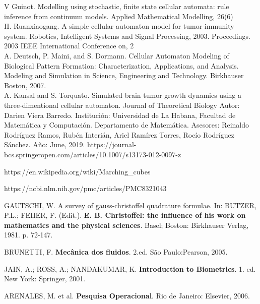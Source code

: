 \documentclass[a4paper,11pt]{article}
\begin{document}
{\begin{flushleft}
\begin{thebibliography}{99}
 V Guinot. Modelling using stochastic, finite state cellular automata: rule inference from continuum models. Applied Mathematical Modelling, 26(6)\\
 H. Ruanxiaogang. A simple cellular automaton model for tumor-immunity system. Robotics, Intelligent Systems and Signal Processing, 2003. Proceedings. 2003 IEEE International Conference on, 2\\
 A. Deutsch, P. Maini, and S. Dormann. Cellular Automaton Modeling of Biological Pattern Formation: Characterization, Applications, and Analysis. Modeling and Simulation in Science, Engineering and Technology. Birkhauser Boston, 2007.\\
 A. Kansal and S. Torquato. Simulated brain tumor growth dynamics using a three-dimentional cellular automaton. Journal of Theoretical Biology
 Autor: Darien Viera Barredo. Instituci\'on: Universidad de La Habana, Facultad de Matem\'atica y Computaci\'on. Departamento de Matem\'atica. Asesores: Reinaldo Rodr\'iguez Ramos, Rub\'en Interi\'an, Ariel Ram\'irez Torres, Roc\'io Rodr\'iguez S\'anchez. A\~no: June, 2019.
 https://journal-bcs.springeropen.com/articles/10.1007/s13173-012-0097-z

 https://en.wikipedia.org/wiki/Marching_cubes

 https://ncbi.nlm.nih.gov/pmc/articles/PMC8321043

\end{thebibliography}


GAUTSCHI, W. A survey of gauss-christoffel quadrature formulae. In: BUTZER, P.L.; FEHER, F. (Edit.). {\bf E. B. Christoffel: the influence of his work on mathematics and the physical sciences}. Basel; Boston: Birkhauser Verlag, 1981. p. 72-147.

\vskip 0.2cm
BRUNETTI, F. \textbf{Mecânica dos fluidos}. 2.ed. São Paulo:Pearson, 2005.

\vskip 0.2cm
JAIN, A.; ROSS, A.; NANDAKUMAR, K. \textbf{Introduction to Biometrics}. 1. ed. New York: Springer, 2001.

\vskip 0.2cm


ARENALES, M. et al. \textbf{Pesquisa Operacional}. Rio de Janeiro: Elsevier, 2006.

\vskip 0.2cm


\end{flushleft}}
\end{document}
